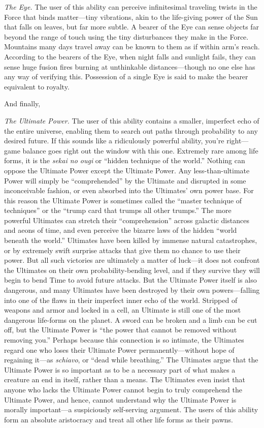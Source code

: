 {
 \textit{The Eye.} The user of this ability can perceive
infinitesimal traveling twists in the Force that binds matter---tiny
vibrations, akin to the life-giving power of the Sun that falls on
leaves, but far more subtle. A bearer of the Eye can sense objects far
beyond the range of touch using the tiny disturbances they make in the
Force. Mountains many days travel away can be known to them as if
within arm's reach. According to the bearers of the
Eye, when night falls and sunlight fails, they can sense huge fusion
fires burning at unthinkable distances---though no one else has any way
of verifying this. Possession of a single Eye is said to make the
bearer equivalent to royalty.}

{
 And finally,}

{
  \textit{The Ultimate Power.} The user of this ability contains a
smaller, imperfect echo of the entire universe, enabling them to search
out paths through probability to any desired future. If this sounds
like a ridiculously powerful ability, you're
right---game balance goes right out the window with this one. Extremely
rare among life forms, it is the \textit{sekai no ougi} or
``hidden technique of the world.''
Nothing can oppose the Ultimate Power except the Ultimate Power. Any
less-than-ultimate Power will simply be
``comprehended'' by the Ultimate and
disrupted in some inconceivable fashion, or even absorbed into the
Ultimates' own power base. For this reason the Ultimate
Power is sometimes called the ``master technique of
techniques'' or the ``trump card
that trumps all other trumps.'' The more powerful
Ultimates can stretch their
``comprehension'' across galactic
distances and aeons of time, and even perceive the bizarre laws of the
hidden ``world beneath the world.''
Ultimates have been killed by immense natural catastrophes, or by
extremely swift surprise attacks that give them no chance to use their
power. But all such victories are ultimately a matter of luck---it does
not confront the Ultimates on their own probability-bending level, and
if they survive they will begin to bend Time to avoid future attacks.
But the Ultimate Power itself is also dangerous, and many Ultimates
have been destroyed by their own powers---falling into one of the flaws
in their imperfect inner echo of the world. Stripped of weapons and
armor and locked in a cell, an Ultimate is still one of the most
dangerous life-forms on the planet. A sword can be broken and a limb
can be cut off, but the Ultimate Power is ``the power
that cannot be removed without removing you.''
Perhaps because this connection is so intimate, the Ultimates regard
one who loses their Ultimate Power permanently---without hope of
regaining it---as \textit{schiavo}, or ``dead while
breathing.'' The Ultimates argue that the Ultimate
Power is so important as to be a necessary part of what makes a
creature an end in itself, rather than a means. The Ultimates even
insist that anyone who lacks the Ultimate Power cannot begin to truly
comprehend the Ultimate Power, and hence, cannot understand why the
Ultimate Power is morally important---a suspiciously self-serving
argument. The users of this ability form an absolute aristocracy and
treat all other life forms as their pawns. }

